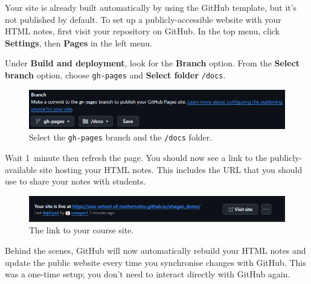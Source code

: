 Your site is already built automatically by using the GitHub template, but it's not published by default. To set up a publicly-accessible website with your HTML notes, first visit your repository on GitHub. In the top menu, click \textbf{Settings}, then \textbf{Pages} in the left menu.

Under \textbf{Build and deployment}, look for the \textbf{Branch} option. From the \textbf{Select branch} option, choose \texttt{gh-pages} and \textbf{Select folder} \texttt{/docs}.

\begin{figure}[h]
    \centering
    \includegraphics[width=\columnwidth]{img/GitHub-Pages.png}
    \caption{Select the \texttt{gh-pages} branch and the \texttt{/docs} folder.}
    \label{fig:gh-pages}
\end{figure}

Wait 1~minute then refresh the page. You should now see a link to the publicly-available site hosting your HTML notes. This includes the URL that you should use to share your notes with students.

\begin{figure}[h]
    \centering
    \includegraphics[width=\columnwidth]{img/GitHub-site-link.png}
    \caption{The link to your course site.}
    \label{fig:gh-site-link}
\end{figure}

Behind the scenes, GitHub will now automatically rebuild your HTML notes and update the public website every time you synchronise changes with GitHub. This was a one-time setup; you don't need to interact directly with GitHub again.

